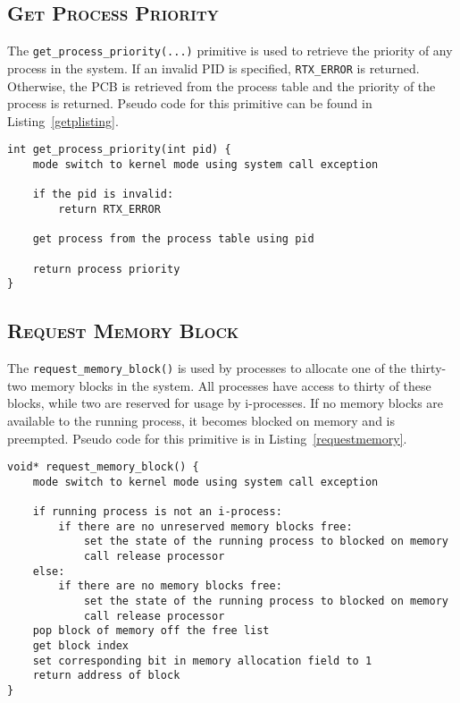 \documentclass[oneside]{report}
\begin{document}
\subsection{\textsc{Get Process Priority}}
The \texttt{get\_process\_priority(...)} primitive is used to retrieve the
priority of any process in the system. If an invalid PID is specified,
\texttt{RTX\_ERROR} is returned. Otherwise, the PCB is retrieved from
the process table and the priority of the process is returned. Pseudo
code for this primitive can be found in Listing~\ref{getplisting}.

\begin{lstlisting}
int get_process_priority(int pid) {
    mode switch to kernel mode using system call exception
    
    if the pid is invalid:
        return RTX_ERROR

    get process from the process table using pid
    
    return process priority
}
\end{lstlisting}

\subsection{\textsc{Request Memory Block}}

The \texttt{request\_memory\_block()} is used by processes to allocate
one of the thirty-two memory blocks in the system. All processes have
access to thirty of these blocks, while two are reserved for usage by
i-processes. If no memory blocks are available to the running process,
it becomes blocked on memory and is preempted. Pseudo code for this
primitive is in Listing~\ref{requestmemory}.

\begin{lstlisting}
void* request_memory_block() {
    mode switch to kernel mode using system call exception

    if running process is not an i-process:
        if there are no unreserved memory blocks free:
            set the state of the running process to blocked on memory
            call release processor
    else:
        if there are no memory blocks free:
            set the state of the running process to blocked on memory
            call release processor
    pop block of memory off the free list        
    get block index
    set corresponding bit in memory allocation field to 1
    return address of block
}
\end{lstlisting}
\end{document}
